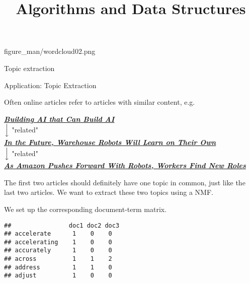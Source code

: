 \documentclass[11pt,compress,t,notes=noshow, xcolor=table]{beamer}
\title{Algorithms and Data Structures}
\begin{document}
{figure_man/wordcloud02.png}
{
  \item Topic extraction
}


\begin{vbframe}{Application: Topic Extraction}

Often online articles refer to articles with similar content, e.g.

\begin{center}
	\textbf{\emph{\href{https://www.nytimes.com/2017/11/05/technology/machine-learning-artificial-intelligence-ai.html?rref=collection\%2Fsectioncollection\%2Ftechnology&action=click&contentCollection=technology&region=rank&module=package&version=highlights&contentPlacement=2&pgtype=sectionfront}{Building AI that Can Build AI}}} \\
	$\Big\downarrow$ \footnotesize{"related"}\\
	\normalsize \textbf{	\emph{\href{https://www.nytimes.com/2017/09/10/business/warehouse-robots-learning.html?action=click&contentCollection=Technology&module=RelatedCoverage&region=Marginalia&pgtype=article}{In the Future, Warehouse Robots Will Learn on Their Own}}} \\
	$\Big\downarrow$ \footnotesize "related"\\
	\normalsize\textbf{	\emph{\href{https://www.nytimes.com/2017/09/10/technology/amazon-robots-workers.html?action=click&contentCollection=Business\%20Day&module=RelatedCoverage&region=Marginalia&pgtype=article}{As Amazon Pushes Forward With Robots, Workers Find New Roles}}}
\end{center}

The first two articles should definitely have one topic in common, just like the last two articles. We want to extract these two topics using a NMF.

\framebreak

We set up the corresponding document-term matrix.

\lz

\begin{footnotesize}
\begin{verbatim}
##                doc1 doc2 doc3
## accelerate      1    0    0
## accelerating    1    0    0
## accurately      1    0    0
## across          1    1    2
## address         1    1    0
## adjust          1    0    0
\end{verbatim}
\end{footnotesize}


\end{vbframe}
\end{document}
